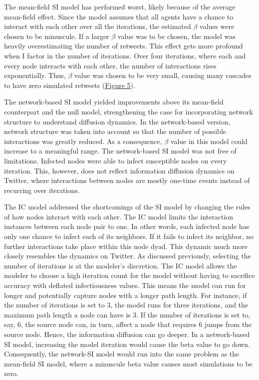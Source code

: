 \documentclass[11pt,a4paper]{article}
\begin{document}
    The mean-field SI model has performed worst, likely because of the average mean-field effect. Since the model assumes that all agents have a chance to interact with each other over all the iterations, the estimated $\beta$ values were chosen to be minuscule. If a larger $\beta$ value was to be chosen, the model was heavily overestimating the number of retweets. This effect gets more profound when I factor in the number of iterations. Over four iterations, where each and every node interacts with each other, the number of interactions rises exponentially. Thus, $\beta$ value was chosen to be very small, causing many cascades to have zero simulated retweets (\hyperlink{fig:base-SI}{Figure 5}).
    
    The network-based SI model yielded improvements above its mean-field counterpart and the null model, strengthening the case for incorporating network structure to understand diffusion dynamics. In the network-based version, network structure was taken into account so that the number of possible interactions was greatly reduced. As a consequence, $\beta$ value in this model could increase to a meaningful range. The network-based SI model was not free of limitations. Infected nodes were able to infect susceptible nodes on every iteration. This, however, does not reflect information diffusion dynamics on Twitter, where interactions between nodes are mostly one-time events instead of recurring over iterations.
    
    The IC model addressed the shortcomings of the SI model by changing the rules of how nodes interact with each other. The IC model limits the interaction instances between each node pair to one. In other words, each infected node has only one chance to infect each of its neighbors. If it fails to infect its neighbor, no further interactions take place within this node dyad. This dynamic much more closely resembles the dynamics on Twitter. As discussed previously, selecting the number of iterations is at the modeler's discretion. The IC model allows the modeler to choose a high iteration count for the model without having to sacrifice accuracy with deflated infectiousness values. This means the model can run for longer and potentially capture nodes with a longer path length. For instance, if the number of iterations is set to 3, the model runs for three iterations, and the maximum path length a node can have is 3. If the number of iterations is set to, say, 6, the source node can, in turn, affect a node that requires 6 jumps from the source node. Hence, the information diffusion can go deeper. In a network-based SI model, increasing the model iteration would cause the beta value to go down. Consequently, the network-SI model would run into the same problem as the mean-field SI model, where a minuscule beta value causes most simulations to be zero.
    
\end{document}
